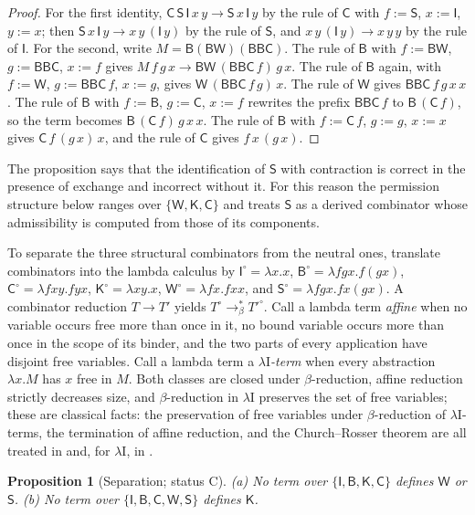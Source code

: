 \documentclass[11pt]{article}
\newtheorem{proposition}[theorem]{Proposition}
\theoremstyle{definition}
\theoremstyle{remark}
\newcommand{\cI}{\mathsf{I}}
\newcommand{\cB}{\mathsf{B}}
\newcommand{\cC}{\mathsf{C}}
\newcommand{\cK}{\mathsf{K}}
\newcommand{\cW}{\mathsf{W}}
\newcommand{\cS}{\mathsf{S}}
\newcommand{\Ct}{status C}
\begin{document}
\begin{proof}
For the first identity, $\cC\,\cS\,\cI\,x\,y\to\cS\,x\,\cI\,y$ by the rule of $\cC$ with $f:=\cS$, $x:=\cI$, $y:=x$; then $\cS\,x\,\cI\,y\to x\,y\,(\cI\,y)$ by the rule of $\cS$, and $x\,y\,(\cI\,y)\to x\,y\,y$ by the rule of $\cI$. For the second, write $M=\cB(\cB\cW)(\cB\cB\cC)$. The rule of $\cB$ with $f:=\cB\cW$, $g:=\cB\cB\cC$, $x:=f$ gives $M\,f\,g\,x\to\cB\cW\,(\cB\cB\cC\,f)\,g\,x$. The rule of $\cB$ again, with $f:=\cW$, $g:=\cB\cB\cC\,f$, $x:=g$, gives $\cW\,(\cB\cB\cC\,f\,g)\,x$. The rule of $\cW$ gives $\cB\cB\cC\,f\,g\,x\,x$. The rule of $\cB$ with $f:=\cB$, $g:=\cC$, $x:=f$ rewrites the prefix $\cB\cB\cC\,f$ to $\cB\,(\cC\,f)$, so the term becomes $\cB\,(\cC\,f)\,g\,x\,x$. The rule of $\cB$ with $f:=\cC\,f$, $g:=g$, $x:=x$ gives $\cC\,f\,(g\,x)\,x$, and the rule of $\cC$ gives $f\,x\,(g\,x)$.
\end{proof}

The proposition says that the identification of $\cS$ with contraction is correct in the presence of exchange and incorrect without it. For this reason the permission structure below ranges over $\{\cW,\cK,\cC\}$ and treats $\cS$ as a derived combinator whose admissibility is computed from those of its components.

To separate the three structural combinators from the neutral ones, translate combinators into the lambda calculus by $\cI^\circ=\lambda x.x$, $\cB^\circ=\lambda fgx.f(gx)$, $\cC^\circ=\lambda fxy.fyx$, $\cK^\circ=\lambda xy.x$, $\cW^\circ=\lambda fx.fxx$, and $\cS^\circ=\lambda fgx.fx(gx)$. A combinator reduction $T\to T'$ yields $T^\circ\to_\beta^{*}T'^\circ$. Call a lambda term \emph{affine} when no variable occurs free more than once in it, no bound variable occurs more than once in the scope of its binder, and the two parts of every application have disjoint free variables. Call a lambda term a \emph{$\lambda\mathrm{I}$-term} when every abstraction $\lambda x.M$ has $x$ free in $M$. Both classes are closed under $\beta$-reduction, affine reduction strictly decreases size, and $\beta$-reduction in $\lambda\mathrm{I}$ preserves the set of free variables; these are classical facts: the preservation of free variables under $\beta$-reduction of $\lambda\mathrm{I}$-terms, the termination of affine reduction, and the Church--Rosser theorem are all treated in \citet{barendregt1984} and, for $\lambda\mathrm{I}$, in \citet{church1941}.

\begin{proposition}[Separation; \Ct]\label{prop:sep}
(a) No term over $\{\cI,\cB,\cK,\cC\}$ defines $\cW$ or $\cS$. (b) No term over $\{\cI,\cB,\cC,\cW,\cS\}$ defines $\cK$.
\end{proposition}
\end{document}
